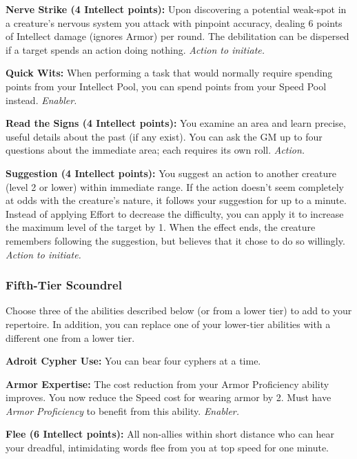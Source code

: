 \documentclass[a4paper,10pt,final,twocolumn,oneside]{book}
\newcommand{\itemAbility}[2]{\textcolor{25gray}{\textbullet\textbf{ #1:}}{ #2}\par}
\newcommand{\enabler}{\textit{ Enabler.}}
\newcommand{\action}{\textit{ Action.}}
\newcommand{\actionInit}{\textit{ Action to initiate.}}
\begin{document}
\itemAbility{Nerve Strike (4 Intellect points)}{Upon discovering a potential weak-spot in a creature's nervous system you attack with pinpoint accuracy, dealing 6 points of Intellect damage (ignores Armor) per round. The debilitation can be dispersed if a target spends an action doing nothing.\actionInit}

\itemAbility{Quick Wits}{When performing a task that would normally require spending points from your Intellect Pool, you can spend points from your Speed Pool instead.\enabler}

\itemAbility{Read the Signs (4 Intellect points)}{You examine an area and learn precise, useful details about the past (if any exist). You can ask the GM up to four questions about the immediate area; each requires its own roll. \action}

\itemAbility{Suggestion (4 Intellect points)}{You suggest an action to another creature (level 2 or lower) within immediate range. If the action doesn’t seem completely at odds with the creature’s nature, it follows your suggestion for up to a minute. Instead of applying Effort to decrease the difficulty, you can apply it to increase the maximum level of the target by 1. When the effect ends, the creature remembers following the suggestion, but believes that it chose to do so willingly. \actionInit}


\subsubsection*{Fifth-Tier Scoundrel}
\label{subsub:scoundrelFifthTier}

Choose three of the abilities described below (or from a lower tier) to add to your repertoire. In addition, you can replace one of your lower-tier abilities with a different one from a lower tier.

\itemAbility{Adroit Cypher Use}{You can bear four cyphers at a time.}

\itemAbility{Armor Expertise}{The cost reduction from your Armor Proficiency ability improves. You now reduce the Speed cost for wearing armor by 2. Must have \textit{Armor Proficiency} to benefit from this ability.\enabler}

\itemAbility{Flee (6 Intellect points)}{All non-allies within short distance who can hear your dreadful, intimidating words flee from you at top speed for one minute.}
\end{document}

